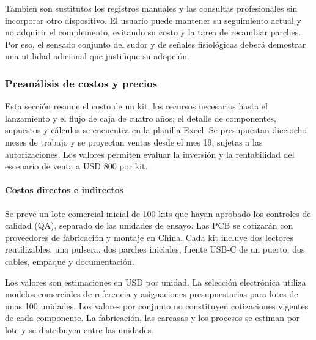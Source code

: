 También son sustitutos los registros manuales y las consultas profesionales sin incorporar otro dispositivo. El usuario puede mantener su seguimiento actual y no adquirir el complemento, evitando su costo y la tarea de recambiar parches. Por eso, el sensado conjunto del sudor y de señales fisiológicas deberá demostrar una utilidad adicional que justifique su adopción.



\FloatBarrier

\subsubsection{Preanálisis de costos y precios}
Esta sección resume el costo de un kit, los recursos necesarios hasta el lanzamiento y el flujo de caja de cuatro años; el detalle de componentes, supuestos y cálculos se encuentra en la planilla Excel. Se presupuestan dieciocho meses de trabajo y se proyectan ventas desde el mes 19, sujetas a las autorizaciones. Los valores permiten evaluar la inversión y la rentabilidad del escenario de venta a USD 800 por kit.

\paragraph{Costos directos e indirectos}

Se prevé un lote comercial inicial de 100 kits que hayan aprobado los controles de calidad (QA), separado de las unidades de ensayo. Las PCB se cotizarán con proveedores de fabricación y montaje en China. Cada kit incluye dos lectores reutilizables, una pulsera, dos parches iniciales, fuente USB-C de un puerto, dos cables, empaque y documentación.

Los valores son estimaciones en USD por unidad.
La selección electrónica utiliza modelos comerciales de referencia y asignaciones presupuestarias para lotes de unas 100 unidades. Los valores por conjunto no constituyen cotizaciones vigentes de cada componente.
La fabricación, las carcasas y los procesos se estiman
por lote y se distribuyen entre las unidades.



